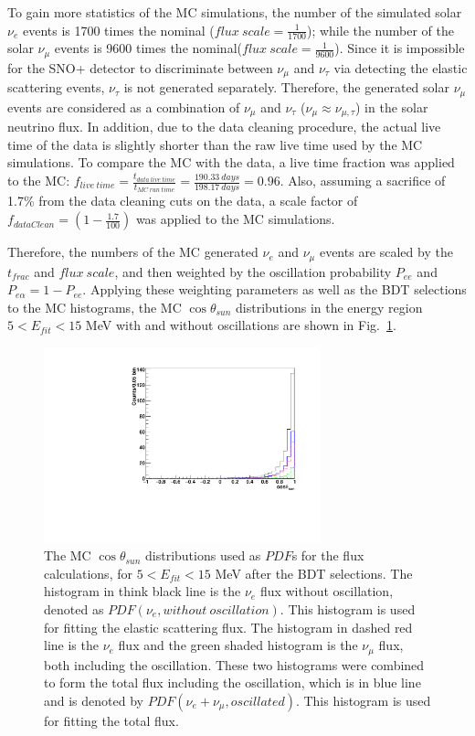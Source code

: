 To gain more statistics of the MC simulations, the number of the simulated solar $\nu_e$ events is 1700 times the nominal ($flux~scale = \frac{1}{1700}$); while the number of the solar $\nu_\mu$ events is 9600 times the nominal($flux~scale=\frac{1}{9600}$). Since it is impossible for the SNO+ detector to discriminate between $\nu_\mu$ and $\nu_\tau$ via detecting the elastic scattering events, $\nu_\tau$ is not generated separately\cite{marzec2019measurement}. Therefore, the generated solar $\nu_\mu$ events are considered as a combination of $\nu_\mu$ and $\nu_\tau$ ($\nu_\mu\approx\nu_{\mu,\tau}$) in the solar neutrino flux. In addition, due to the data cleaning procedure, the actual live time of the data is slightly shorter than the raw live time used by the MC simulations. To compare the MC with the data, a live time fraction was applied to the MC: $f_{live~time}=\frac{t_{data~live~time}}{t_{MC~run~time}}=\frac{190.33~days}{198.17~days} = 0.96$. Also, assuming a sacrifice of 1.7\% from the data cleaning cuts on the data, a scale factor of $f_{dataClean}=(1-\frac{1.7}{100})$ was applied to the MC simulations.

Therefore, the numbers of the MC generated $\nu_e$ and $\nu_\mu$ events are scaled by the $t_{frac}$ and $flux~scale$, and then weighted by the oscillation probability $P_{ee}$ and $P_{e\alpha}=1-P_{ee}$. Applying these weighting parameters as well as the BDT selections to the MC histograms, the MC $\cos\theta_{sun}$ distributions in the energy region $5<E_{fit}<15$ MeV with and without oscillations are shown in Fig.~\ref{fig:MCfluxPdfs}.

\begin{figure}[!htb]
	\centering
	\includegraphics[width=8cm]{MCfluxPdfs.pdf}
	\caption[The MC $\cos\theta_{sun}$ distributions used as $PDF$s for the flux calculations, for $5<E_{fit}<15$ MeV after the BDT selections.]{The MC $\cos\theta_{sun}$ distributions used as $PDF$s for the flux calculations, for $5<E_{fit}<15$ MeV after the BDT selections. The histogram in think black line is the $\nu_e$ flux without oscillation, denoted as $PDF(\nu_e,without~oscillation)$. This histogram is used for fitting the elastic scattering flux. The histogram in dashed red line is the $\nu_e$ flux and the green shaded histogram is the $\nu_\mu$ flux, both including the oscillation. These two histograms were combined to form the total flux including the oscillation, which is in blue line and is denoted by $PDF(\nu_e+\nu_\mu,oscillated)$. This histogram is used for fitting the total flux.}
	\label{fig:MCfluxPdfs}
\end{figure} 

